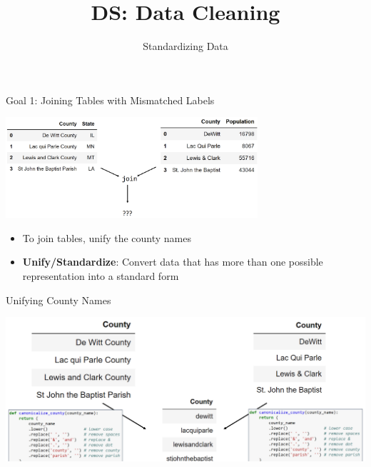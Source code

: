 \documentclass[aspectratio=169]{../latex_main/tntbeamer}  %
\title[Standardizing Data]{DS: Data Cleaning}
\subtitle{Standardizing Data}
\begin{document}
	
	\maketitle

\begin{frame}[c]{Goal 1: Joining Tables with Mismatched Labels}

\centering\includegraphics[width=0.7\textwidth]{figure/bild23_join}

\begin{itemize}
    \item To join tables, unify the county names
    \item \textbf{Unify/Standardize}: Convert data that has more than one possible representation into a standard form
\end{itemize}

\end{frame}


\begin{frame}[c]{Unifying County Names}

\centering\includegraphics[width=1.0\textwidth]{figure/bild23_join2}

\end{frame}
\end{document}
